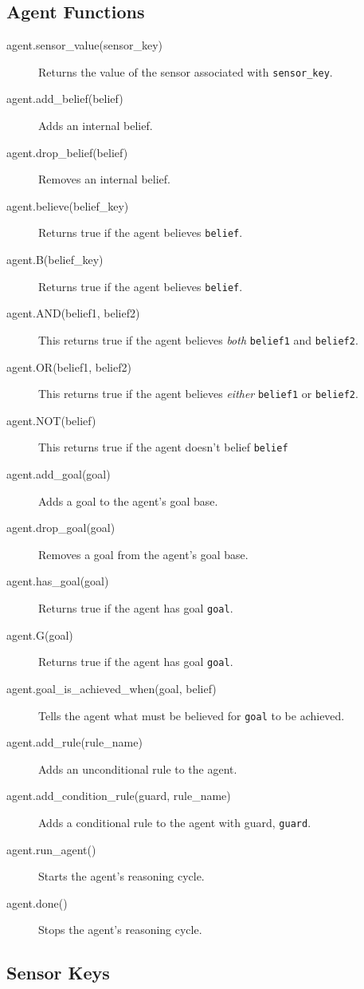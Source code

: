 \documentclass[a4,12pt]{article}
\begin{document}
\subsection{Agent Functions}

  \begin{description}
\item[agent.sensor\_value(sensor\_key)] Returns the value of the sensor associated with \lstinline{sensor_key}.
\item[agent.add\_belief(belief)] Adds an internal belief.
\item[agent.drop\_belief(belief)] Removes an internal belief.
  \item[agent.believe(belief\_key)] Returns true if the agent believes \lstinline{belief}.
  \item[agent.B(belief\_key)] Returns true if the agent believes \lstinline{belief}.
  \item[agent.AND(belief1, belief2)] This returns true if the agent believes \emph{both} \lstinline{belief1} and \lstinline{belief2}.
  \item[agent.OR(belief1, belief2)] This returns true if the agent believes \emph{either} \lstinline{belief1} or \lstinline{belief2}.
  \item[agent.NOT(belief)] This returns true if the agent doesn't belief \lstinline{belief}
 \item[agent.add\_goal(goal)] Adds a goal to the agent's goal base.
 \item[agent.drop\_goal(goal)] Removes a goal from the agent's goal base.
 \item[agent.has\_goal(goal)] Returns true if the agent has goal \lstinline{goal}.
 \item[agent.G(goal)] Returns true if the agent has goal \lstinline{goal}.
 \item[agent.goal\_is\_achieved\_when(goal, belief)] Tells the agent what must be believed for \lstinline{goal} to be achieved.
 \item[agent.add\_rule(rule\_name)] Adds an unconditional rule to the agent.
 \item[agent.add\_condition\_rule(guard, rule\_name)] Adds a conditional rule to the agent with guard, \lstinline{guard}.
 \item[agent.run\_agent()] Starts the agent's reasoning cycle.
 \item[agent.done()] Stops the agent's reasoning cycle.
  \end{description}

\subsection{Sensor Keys}
\end{document}
